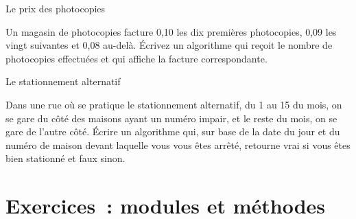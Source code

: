 		\begin{Exercice}{Le prix des photocopies}

			Un magasin de photocopies facture 0,10 \texteuro{} 
			les dix premières photocopies, 
			0,09 \texteuro{} les vingt suivantes 
			et 0,08 \texteuro{} au-delà. 
			Écrivez un algorithme 
			qui reçoit le nombre de photocopies effectuées 
			et qui affiche la facture correspondante.
		\end{Exercice}

		\begin{Exercice}{Le stationnement alternatif}

			Dans une rue où se pratique le stationnement alternatif, 
			du 1 au 15 du mois, on se gare du côté des maisons ayant un numéro impair, 
			et le reste du mois, on se gare de l’autre côté. 
			Écrire un algorithme qui, sur base de la date du jour et du numéro de maison
			devant laquelle vous vous êtes arrêté, 
			retourne vrai si vous êtes bien stationné et faux sinon.
		\end{Exercice}





\section{Exercices~: modules et méthodes}

